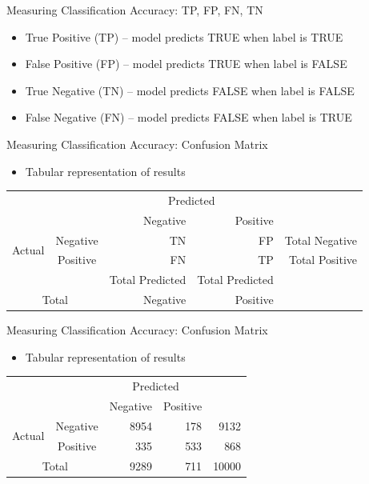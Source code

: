 \documentclass[aspectratio=169]{beamer}
\begin{document}
\begin{frame}{Measuring Classification Accuracy: TP, FP, FN, TN}

\begin{itemize}
\item True Positive (TP) -- model predicts TRUE when label is TRUE
\item False Positive (FP) -- model predicts TRUE when label is FALSE
\item True Negative (TN) -- model predicts FALSE when label is FALSE
\item False Negative (FN) -- model predicts FALSE when label is TRUE
\end{itemize}

\end{frame}
\begin{frame}{Measuring Classification Accuracy: Confusion Matrix}

\begin{itemize}
\item Tabular representation of results 
\end{itemize}
\begin{tabular}{|c|c|r|r|r|} \hline
\multicolumn{2}{|c|}{}   &   \multicolumn{2}{c|}{Predicted}  & \\ \cline{3-4}
\multicolumn{2}{|c|}{} & Negative & Positive  & \\ \hline  
\multirow{2}{*}{Actual} & Negative & TN & FP  & Total Negative \\ \cline{2-5}
 & Positive & FN & TP  & Total Positive \\ \hline \hline
 \multicolumn{2}{|c|}{} &  Total Predicted & Total Predicted &  \\ 
 \multicolumn{2}{|c|}{Total} &  Negative&  Positive & \\ \hline
 \end{tabular}

\end{frame}
\begin{frame}{Measuring Classification Accuracy: Confusion Matrix}

\begin{itemize}
\item Tabular representation of results 
\end{itemize}
\begin{tabular}{|c|c|r|r|r|} \hline
\multicolumn{2}{|c|}{}   &   \multicolumn{2}{c|}{Predicted}  & \\ \cline{3-4}
\multicolumn{2}{|c|}{} & Negative & Positive  & \\ \hline  
\multirow{2}{*}{Actual} & Negative & 8954 & 178  & 9132 \\ \cline{2-5}
 & Positive & 335 & 533  & 868 \\ \hline \hline
 \multicolumn{2}{|c|}{Total} & 9289 & 711  & 10000\\ \hline
 \end{tabular}

\end{frame}
\end{document}
